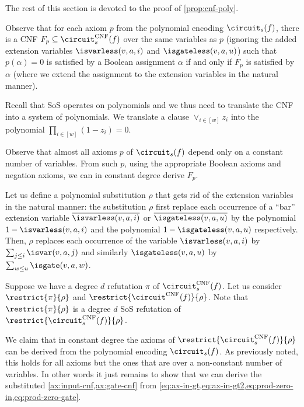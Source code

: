 The rest of this section is devoted to the proof of
\cref{prop:cnf-poly}.

Observe that for each axiom $p$ from the polynomial encoding
$\circuit_s(f)$, there is a CNF
$F_p \subseteq \circuit_s^{\mathrm{CNF}}(f)$ over the same variables
as $p$ (ignoring the added extension variables $\isvarless(v, a, i)$
and $\isgateless(v, a, u)$) such that $p(\alpha) = 0$ is satisfied by
a Boolean assignment $\alpha$ if and only if $F_p$ is satisfied by
$\alpha$ (where we extend the assignment to the extension variables in
the natural manner).



Recall that SoS operates on polynomials and we thus need to translate
the CNF into a system of polynomials. We translate a clause
$\vee_{i \in [w]} z_i$ into the polynomial
$\prod_{i \in [w]}(1 - z_i) = 0$.

Observe that almost all axioms $p$ of $\circuit_s(f)$ depend only on a
constant number of variables. From such $p$, using the appropriate
Boolean axioms and negation axioms, we can in constant degree derive
$F_p$.

Let us define a polynomial substitution $\rho$ that gets rid of the
extension variables in the natural manner: the substitution $\rho$
first replace each occurrence of a ``bar'' extension variable
$\overline{\isvarless(v, a, i)}$ or $\overline{\isgateless(v, a, u)}$
by the polynomial $1-\isvarless(v, a, i)$ and the polynomial
$1-\isgateless(v, a, u)$ respectively. Then, $\rho$ replaces each
occurrence of the variable $\isvarless(v, a, i)$ by
$\sum_{j \le i} \isvar(v, a, j)$ and similarly $\isgateless(v, a, u)$
by $\sum_{w \le u} \isgate(v, a, w)$.

Suppose we have a degree $d$ refutation $\pi$ of
$\circuit_s^{\mathrm{CNF}}(f)$. Let us consider $\restrict{\pi}{\rho}$
and $\restrict{\circuit^{\mathrm{CNF}}(f)}{\rho}$. Note that
$\restrict{\pi}{\rho}$ is a degree $d$ SoS refutation of
$\restrict{\circuit^{\mathrm{CNF}}_s(f)}{\rho}$.

We claim that in constant degree the axioms of
$\restrict{\circuit^{\mathrm{CNF}}_s(f)}{\rho}$ can be derived from the
polynomial encoding $\circuit_s(f)$. As previously noted, this holds
for all axioms but the ones that are over a non-constant number of
variables. In other words it just remains to show that we can derive
the substituted \cref{ax:input-cnf,ax:gate-cnf} from
\cref{eq:ax-in-gt,eq:ax-in-gt2,eq:prod-zero-in,eq:prod-zero-gate}.

